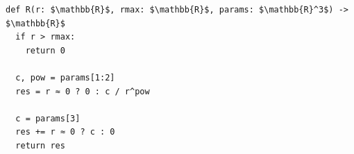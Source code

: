 \documentclass[border=10pt]{standalone}
\begin{document}
\begin{lstlisting}
def R(r: $\mathbb{R}$, rmax: $\mathbb{R}$, params: $\mathbb{R}^3$) -> $\mathbb{R}$
  if r > rmax:
    return 0

  c, pow = params[1:2]
  res = r ≈ 0 ? 0 : c / r^pow

  c = params[3]
  res += r ≈ 0 ? c : 0
  return res
\end{lstlisting}
\end{document}
